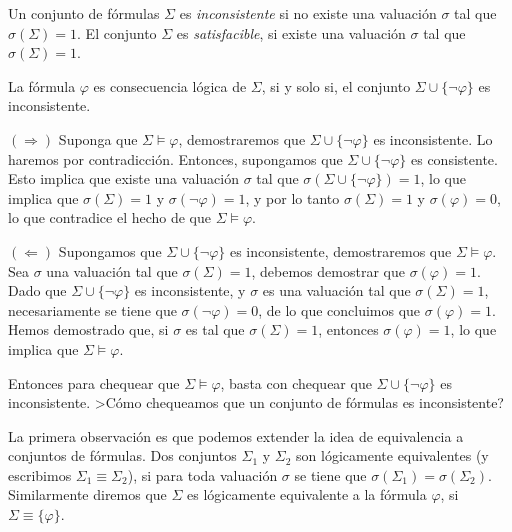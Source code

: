 \begin{definicion}
Un conjunto de f\'ormulas $\Sigma$ es {\em inconsistente} si no existe una valuaci\'on $\sigma$ tal que 
$\sigma(\Sigma)=1$.
El conjunto $\Sigma$ es {\em satisfacible}, si existe una valuaci\'on $\sigma$ tal que $\sigma(\Sigma)=1$. 
\end{definicion}

\begin{teorema}
La f\'ormula $\varphi$ es consecuencia l\'ogica de $\Sigma$, si y solo si, el conjunto $\Sigma \cup \{\neg \varphi\}$
es inconsistente.
\begin{demostracion}
$(\Rightarrow)$ Suponga que $\Sigma\models \varphi$, demostraremos que $\Sigma \cup \{\neg \varphi\}$ es inconsistente.
Lo haremos por contradicci\'on. Entonces, supongamos que $\Sigma \cup \{\neg \varphi\}$ es consistente.
Esto implica que existe una valuaci\'on $\sigma$ tal que $\sigma(\Sigma\cup\{\neg \varphi\})=1$, lo que implica que 
$\sigma(\Sigma)=1$ y $\sigma(\neg \varphi)=1$, y por lo tanto $\sigma(\Sigma)=1$ y 
$\sigma(\varphi)=0$, lo que contradice el hecho de que $\Sigma\models \varphi$.

$(\Leftarrow)$ Supongamos que $\Sigma\cup \{\neg \varphi\}$ es inconsistente, demostraremos que $\Sigma \models \varphi$.
Sea $\sigma$ una valuaci\'on tal que $\sigma(\Sigma)=1$, debemos demostrar que $\sigma(\varphi)=1$.
Dado que $\Sigma\cup \{\neg \varphi\}$ es inconsistente, y $\sigma$ es una valuaci\'on tal que $\sigma(\Sigma)=1$, 
necesariamente se tiene que $\sigma(\neg \varphi)=0$, de lo que concluimos que $\sigma(\varphi)=1$.
Hemos demostrado que, si $\sigma$ es tal que $\sigma(\Sigma)=1$, 
entonces $\sigma(\varphi)=1$, lo que implica que $\Sigma\models \varphi$.
\end{demostracion}
\end{teorema}

Entonces para chequear que $\Sigma\models \varphi$, basta con chequear que $\Sigma\cup \{\neg \varphi\}$ es inconsistente.
>C\'omo chequeamos que un conjunto de f\'ormulas es inconsistente?


La primera observaci\'on es que podemos extender la idea de equivalencia a conjuntos de f\'ormulas.
Dos conjuntos $\Sigma_1$ y $\Sigma_2$ son l\'ogicamente equivalentes (y escribimos $\Sigma_1\equiv \Sigma_2$),
si para toda valuaci\'on $\sigma$ se tiene que $\sigma(\Sigma_1)=\sigma(\Sigma_2)$.
Similarmente diremos que $\Sigma$ es l\'ogicamente equivalente a la f\'ormula $\varphi$, si
$\Sigma\equiv \{\varphi\}$.

